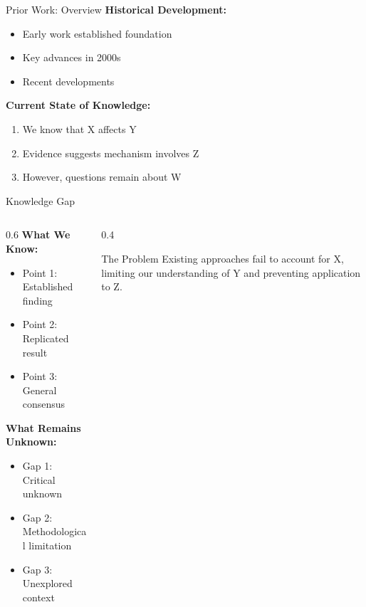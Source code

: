 \documentclass[aspectratio=169,11pt]{beamer}
\begin{document}
\begin{frame}{Prior Work: Overview}
  \textbf{Historical Development:}
  \begin{itemize}
    \item Early work established foundation \cite{seminal1990}
    \item Key advances in 2000s \cite{advance2005,advance2007}
    \item Recent developments \cite{recent2020,recent2022}
  \end{itemize}
  
  \vspace{0.5cm}
  
  \textbf{Current State of Knowledge:}
  \begin{enumerate}
    \item We know that X affects Y
    \item Evidence suggests mechanism involves Z
    \item However, questions remain about W
  \end{enumerate}
\end{frame}

\begin{frame}{Knowledge Gap}
  \begin{columns}[c]
    
    \begin{column}{0.6\textwidth}
      \textbf{What We Know:}
      \begin{itemize}
        \item Point 1: Established finding
        \item Point 2: Replicated result
        \item Point 3: General consensus
      \end{itemize}
      
      \vspace{0.5cm}
      
      \textbf{What Remains Unknown:}
      \begin{itemize}
        \item \alert{Gap 1:} Critical unknown
        \item \alert{Gap 2:} Methodological limitation
        \item \alert{Gap 3:} Unexplored context
      \end{itemize}
    \end{column}
    
    \begin{column}{0.4\textwidth}
      \begin{alertblock}{The Problem}
        Existing approaches fail to account for X, limiting our understanding of Y and preventing application to Z.
      \end{alertblock}
    \end{column}
    
  \end{columns}
\end{frame}
\end{document}
